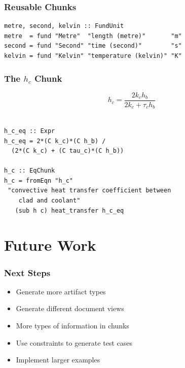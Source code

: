 \documentclass{beamer}
\begin{document}

\begin{frame}[fragile]

\frametitle{Reusable Chunks}

\begin{lstlisting}[frame=none, showstringspaces=false, 
  basicstyle=\small]
metre, second, kelvin :: FundUnit
metre  = fund "Metre"  "length (metre)"       "m"
second = fund "Second" "time (second)"        "s"
kelvin = fund "Kelvin" "temperature (kelvin)" "K"
\end{lstlisting}

\end{frame}


\begin{frame}[fragile]

\frametitle{The $h_c$ Chunk}

$$h_{c} = \frac{2k_{c} h_{b}}{2k_{c}+\tau_{c}h_{b}}$$
~\newline

\begin{lstlisting}[frame=none, showstringspaces=false, basicstyle=\small]
h_c_eq :: Expr
h_c_eq = 2*(C k_c)*(C h_b) /
  (2*(C k_c) + (C tau_c)*(C h_b))

h_c :: EqChunk
h_c = fromEqn "h_c" 
 "convective heat transfer coefficient between 
    clad and coolant"
   (sub h c) heat_transfer h_c_eq

\end{lstlisting}

\end{frame}


\section[Future Work]{Future Work}


\begin{frame}

\frametitle{Next Steps}

\begin{itemize}
\item Generate more artifact types
\item Generate different document views
\item More types of information in chunks
\item Use constraints to generate test cases
\item Implement larger examples
\end{itemize}

\end{frame}
\end{document}
